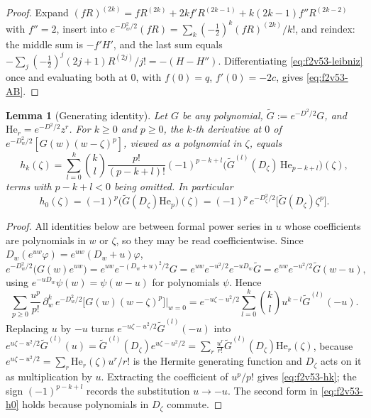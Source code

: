 \documentclass[11pt]{article}
\newtheorem{lemma}[theorem]{Lemma}
\theoremstyle{definition}
\theoremstyle{remark}
\begin{document}
\begin{proof}
Expand \((fR)^{(2k)}=fR^{(2k)}+2kf'R^{(2k-1)}+k(2k-1)f''R^{(2k-2)}\)
with \(f''=2\), insert into
\(e^{-D_w^2/2}(fR)=\sum_k(-\tfrac12)^k(fR)^{(2k)}/k!\), and reindex: the
middle sum is \(-f'H'\), and the last sum equals
\(-\sum_j(-\tfrac12)^j(2j+1)R^{(2j)}/j!=-(H-H'')\).  Differentiating
\eqref{eq:f2v53-leibniz} once and evaluating both at \(0\), with
\(f(0)=q\), \(f'(0)=-2c\), gives \eqref{eq:f2v53-AB}.
\end{proof}

\begin{lemma}[Generating identity]
\label{lem:f2v53-generating}
Let \(G\) be any polynomial, \(\widetilde G:=e^{-D^2/2}G\), and
\(\mathrm{He}_r=e^{-D^2/2}z^r\).  For \(k\ge0\) and \(p\ge0\), the
\(k\)-th derivative at \(0\) of \(e^{-D_w^2/2}[G(w)(w-\zeta)^p]\), viewed
as a polynomial in \(\zeta\), equals
\begin{equation}
 h_k(\zeta)=\sum_{l=0}^{k}\binom kl\frac{p!}{(p-k+l)!}(-1)^{p-k+l}
 \bigl(\widetilde G^{(l)}(D_\zeta)\,\mathrm{He}_{p-k+l}\bigr)(\zeta),
 \label{eq:f2v53-hk}
\end{equation}
terms with \(p-k+l<0\) being omitted.  In particular
\begin{equation}
 \boxed{h_0(\zeta)=(-1)^p\bigl(\widetilde G(D_\zeta)\mathrm{He}_p\bigr)(\zeta)
 =(-1)^p\,e^{-D_\zeta^2/2}\bigl[\widetilde G(D_\zeta)\zeta^p\bigr].}
 \label{eq:f2v53-h0}
\end{equation}
\end{lemma}

\begin{proof}
All identities below are between formal power series in \(u\) whose
coefficients are polynomials in \(w\) or \(\zeta\), so they may be read
coefficientwise.  Since \(D_w(e^{uw}\varphi)=e^{uw}(D_w+u)\varphi\),
\[
 e^{-D_w^2/2}\bigl(G(w)e^{uw}\bigr)
 =e^{uw}e^{-(D_w+u)^2/2}G
 =e^{uw}e^{-u^2/2}e^{-uD_w}\widetilde G
 =e^{uw}e^{-u^2/2}\widetilde G(w-u),
\]
using \(e^{-uD_w}\psi(w)=\psi(w-u)\) for polynomials \(\psi\).  Hence
\[
 \sum_{p\ge0}\frac{u^p}{p!}\,\partial_w^k\,e^{-D_w^2/2}\bigl[G(w)(w-\zeta)^p\bigr]\Big|_{w=0}
 =e^{-u\zeta-u^2/2}\sum_{l=0}^k\binom kl u^{k-l}\widetilde G^{(l)}(-u).
\]
Replacing \(u\) by \(-u\) turns \(e^{-u\zeta-u^2/2}\widetilde G^{(l)}(-u)\)
into \(e^{u\zeta-u^2/2}\widetilde G^{(l)}(u)
 =\widetilde G^{(l)}(D_\zeta)e^{u\zeta-u^2/2}
 =\sum_r\frac{u^r}{r!}\widetilde G^{(l)}(D_\zeta)\mathrm{He}_r(\zeta)\),
because \(e^{u\zeta-u^2/2}=\sum_r\mathrm{He}_r(\zeta)u^r/r!\) is the
Hermite generating function and \(D_\zeta\) acts on it as multiplication
by \(u\).  Extracting the coefficient of \(u^p/p!\) gives
\eqref{eq:f2v53-hk}; the sign \((-1)^{p-k+l}\) records the substitution
\(u\to-u\).  The second form in \eqref{eq:f2v53-h0} holds because
polynomials in \(D_\zeta\) commute.
\end{proof}
\end{document}
